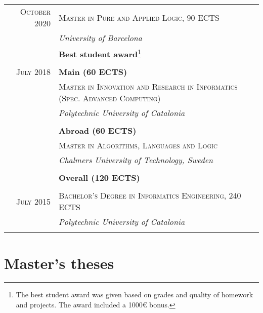 \documentclass[11pt]{article}
\begin{document}
\begin{tabular}{r|p{11cm}}
  \textsc{October 2020} & \textsc{Master in Pure and Applied Logic, 90 ECTS} \\
 & \emph{University of Barcelona}\\
                        & \textbf{Best student award}\footnote{The best student award was given based on grades and quality
                            of homework and projects. The award included a 1000€ bonus.} \\
\multicolumn{2}{c}{} \\

  \textsc{July 2018} & \textbf{Main (60 ECTS)} \\
                        & \textsc{Master in Innovation and Research in Informatics (Spec. Advanced Computing)} \\
                        & \emph{Polytechnic University of Catalonia} \\
                         \\
 & \textbf{Abroad (60 ECTS)}  \\
  & \textsc{Master in Algorithms, Languages and Logic} \\
                        & \emph{Chalmers University of Technology, Sweden} \\
                        \\
                        & \textbf{Overall (120 ECTS)}  \\
  \multicolumn{2}{c}{} \\

  \textsc{July 2015} & \textsc{Bachelor's Degree in Informatics Engineering, 240 ECTS} \\
               & \emph{Polytechnic University of Catalonia}\\
  \multicolumn{2}{c}{} \\
\end{tabular}

\section{Master's theses}
\end{document}

